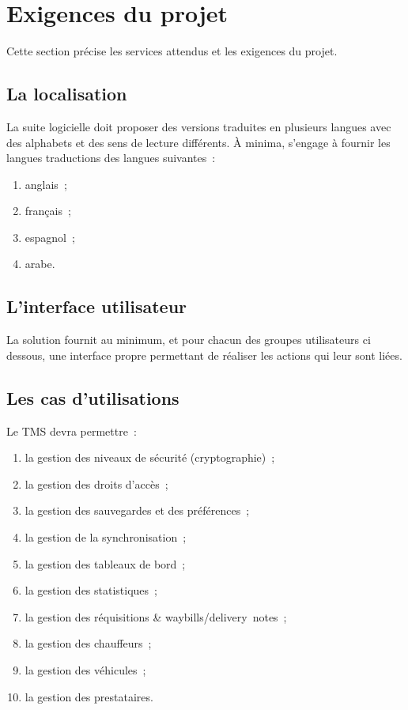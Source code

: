\section{Exigences du projet}
Cette section précise les services attendus et les exigences du projet.

\subsection{La localisation}
La suite logicielle doit proposer des versions traduites en plusieurs langues avec des alphabets et des sens de lecture différents. À minima, \amo s'engage à fournir les langues traductions des langues suivantes~:
\begin{enumerate}
	\item anglais~;
	\item français~;
	\item espagnol~;
	\item arabe.
\end{enumerate}

\subsection{L'interface utilisateur}
La solution fournit au minimum, et pour chacun des groupes utilisateurs ci dessous, une interface propre permettant de réaliser les actions qui leur sont liées.

\subsection{Les cas d'utilisations}
Le TMS devra permettre~:
\begin{enumerate}
	\item la gestion des niveaux de sécurité (cryptographie)~;
	\item la gestion des droits d'accès~;
	\item la gestion des sauvegardes et des préférences~; 
	\item la gestion de la synchronisation~;
	\item la gestion des tableaux de bord~;
	\item la gestion des statistiques~;
	\item la gestion des réquisitions \& waybills/delivery~notes~;
	\item la gestion des chauffeurs~;
	\item la gestion des véhicules~;
	\item la gestion des prestataires.
\end{enumerate}


